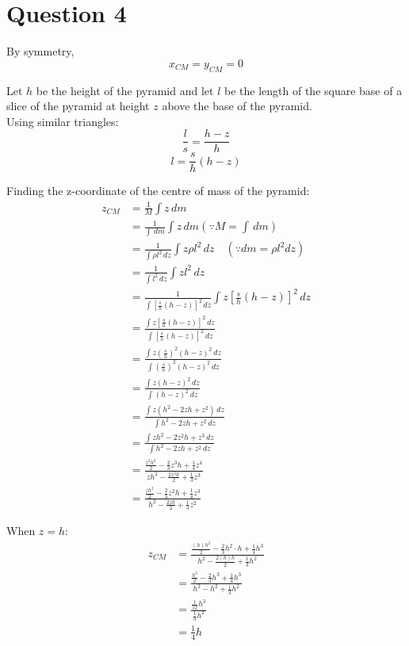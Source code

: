 \documentclass[11pt]{article}
\begin{document}
\section{Question 4}
\label{sec:org7b5956d}

By symmetry,
\[x_{CM} = y_{CM} = 0\]

Let \(h\) be the height of the pyramid and let \(l\) be the length of the square base of a slice of the pyramid at height \(z\) above the base of the pyramid.
\\[0pt]

Using similar triangles:
\[\frac{l}{s} = \frac{h - z}{h}\]
\[l = \frac{s}{h} (h - z)\]

Finding the z-coordinate of the centre of mass of the pyramid:
\begin{align*}
z_{CM} &= \frac{1}{M} \int z \, dm \\
&= \frac{1}{\int \, dm} \int z \, dm (\because M = \int \, dm) \\
&= \frac{1}{\int \rho l^2 \, dz} \int z \rho l^2 \, dz \quad (\because dm = \rho l^2 dz) \\
&= \frac{1}{\int l^2 \, dz} \int z l^2 \, dz \\
&= \frac{1}{\int \left[\frac{s}{h} (h - z) \right]^2 \, dz} \int z \left[\frac{s}{h} (h - z) \right] ^2 \, dz \\
&= \frac{\int z \left[\frac{s}{h} (h - z) \right]^2 \, dz}{\int \left[\frac{s}{h} (h - z) \right]^2 \, dz} \\
&= \frac{\int z \left(\frac{s}{h} \right)^2 (h - z)^2 \, dz}{\int \left(\frac{s}{h} \right)^2 (h - z)^2 \, dz} \\
&= \frac{\int z (h - z)^2 \, dz}{\int (h - z)^2 \, dz} \\
&= \frac{\int z (h^2 - 2zh + z^2) \, dz}{\int h^2 - 2zh + z^2 \, dz} \\
&= \frac{\int zh^2 - 2z^2h + z^3 \, dz}{\int h^2 - 2zh + z^2 \, dz} \\
&= \frac{\frac{z^2h^2}{2} - \frac{2}{3} z^3h + \frac{1}{4} z^4}{zh^2 - \frac{2z^2h}{2} + \frac{1}{3} z^3} \\
&= \frac{\frac{zh^2}{2} - \frac{2}{3} z^2h + \frac{1}{4} z^3}{h^2 - \frac{2zh}{2} + \frac{1}{3} z^2}
\end{align*}

When \(z = h\):
\begin{align*}
z_{CM} &= \frac{\frac{(h)h^2}{2} - \frac{2}{3} h^2 \cdot h + \frac{1}{4} h^3}{h^2 - \frac{2(h)h}{2} + \frac{1}{3} h^2} \\
&= \frac{\frac{h^3}{2} - \frac{2}{3} h^3 + \frac{1}{4} h^3}{h^2 - h^2 + \frac{1}{3} h^2} \\
&= \frac{\frac{1}{12}h^3}{\frac{1}{3}h^2} \\
&= \frac{1}{4}h
\end{align*}
\end{document}
